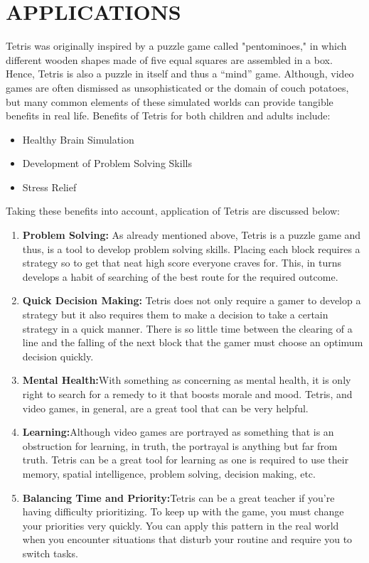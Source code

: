 \newpage
\section{APPLICATIONS}


		\hspace{5mm}Tetris was originally inspired by a puzzle game called "pentominoes," in which different wooden shapes made of five equal squares are assembled in a box. Hence, Tetris is also a puzzle in itself and thus a “mind” game. Although, video games are often dismissed as unsophisticated or the domain of couch potatoes, but many common elements of these simulated worlds can provide tangible benefits in real life. Benefits of Tetris for both children and adults include:
		\begin{itemize}
			\item Healthy Brain Simulation
			\item Development of Problem Solving Skills
			\item Stress Relief
		\end{itemize}
		
		\hspace{5mm}Taking these benefits into account, application of Tetris are discussed below:
		
			\begin{enumerate}
				\item \textbf{Problem Solving:} As already mentioned above, Tetris is a puzzle game and thus, is a tool to develop problem solving skills. Placing each block requires a strategy so
				to get that neat high score everyone craves for. This, in turns develops a habit of searching of the best route for the required outcome.
				\item \textbf{Quick Decision Making:} Tetris does not only require a gamer to develop a strategy but it also requires them to make a decision to take a certain strategy in a
				quick manner. There is so little time between the clearing of a line and the falling of
				the next block that the gamer must choose an optimum decision quickly.
				\item \textbf{Mental Health:}With something as concerning as mental health, it is only right to
				search for a remedy to it that boosts morale and mood. Tetris, and video games, in
				general, are a great tool that can be very helpful.
				\item \textbf{Learning:}Although video games are portrayed as something that is an obstruction
				for learning, in truth, the portrayal is anything but far from truth. Tetris can be a great tool for learning as one is required to use their memory, spatial intelligence, problem solving, decision making, etc.
				\item \textbf{Balancing Time and Priority:}Tetris can be a great teacher if you’re having difficulty prioritizing. To keep up with the game, you must change your priorities
				very quickly. You can apply this pattern in the real world when you encounter situations that disturb your routine and require you to switch tasks.
			\end{enumerate}
		